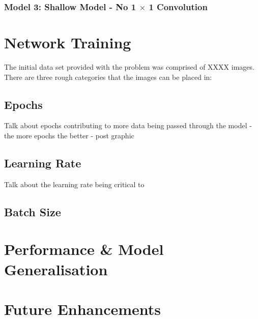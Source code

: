 \documentclass[a4paper]{article}
\begin{document}
\subsubsection{Model 3: Shallow Model - No 1 $\times$ 1 Convolution}

\section{Network Training}
The initial data set provided with the problem was comprised of XXXX images. There are three rough categories that the images can be placed in:



\subsection{Epochs}
Talk about epochs contributing to more data being passed through the model - the more epochs the better - post graphic

\subsection{Learning Rate}
Talk about the learning rate being critical to 

\subsection{Batch Size}

\section{Performance \& Model Generalisation}

\section{Future Enhancements}
\end{document}
